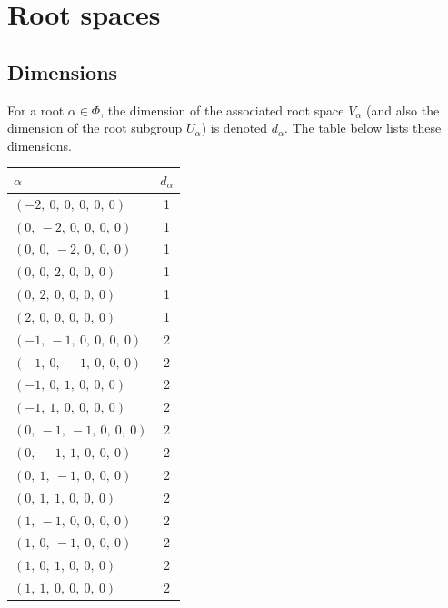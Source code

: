 \documentclass[11pt]{article}
\theoremstyle{definition}
\begin{document}
\fi

\newpage
\section{Root spaces}

\subsection{Dimensions}

For a root $\alpha \in \Phi$, the dimension of the associated root space $V_\alpha$ (and also the dimension of the root subgroup $U_\alpha$) is denoted $d_\alpha$. The table below lists these dimensions.

\bigskip

\noindent \begin{tabular}{|l|c|}
    \hline
    \textbf{$\alpha$} & \textbf{$d_{\alpha}$} \\
    \hline
    $\left( -2, \  0, \  0, \  0, \  0, \  0\right)$ & 1 \\
    \hline
    $\left( 0, \  -2, \  0, \  0, \  0, \  0\right)$ & 1 \\
    \hline
    $\left( 0, \  0, \  -2, \  0, \  0, \  0\right)$ & 1 \\
    \hline
    $\left( 0, \  0, \  2, \  0, \  0, \  0\right)$ & 1 \\
    \hline
    $\left( 0, \  2, \  0, \  0, \  0, \  0\right)$ & 1 \\
    \hline
    $\left( 2, \  0, \  0, \  0, \  0, \  0\right)$ & 1 \\
    \hline
    $\left( -1, \  -1, \  0, \  0, \  0, \  0\right)$ & 2 \\
    \hline
    $\left( -1, \  0, \  -1, \  0, \  0, \  0\right)$ & 2 \\
    \hline
    $\left( -1, \  0, \  1, \  0, \  0, \  0\right)$ & 2 \\
    \hline
    $\left( -1, \  1, \  0, \  0, \  0, \  0\right)$ & 2 \\
    \hline
    $\left( 0, \  -1, \  -1, \  0, \  0, \  0\right)$ & 2 \\
    \hline
    $\left( 0, \  -1, \  1, \  0, \  0, \  0\right)$ & 2 \\
    \hline
    $\left( 0, \  1, \  -1, \  0, \  0, \  0\right)$ & 2 \\
    \hline
    $\left( 0, \  1, \  1, \  0, \  0, \  0\right)$ & 2 \\
    \hline
    $\left( 1, \  -1, \  0, \  0, \  0, \  0\right)$ & 2 \\
    \hline
    $\left( 1, \  0, \  -1, \  0, \  0, \  0\right)$ & 2 \\
    \hline
    $\left( 1, \  0, \  1, \  0, \  0, \  0\right)$ & 2 \\
    \hline
    $\left( 1, \  1, \  0, \  0, \  0, \  0\right)$ & 2 \\
    \hline
\end{tabular}
\end{document}
